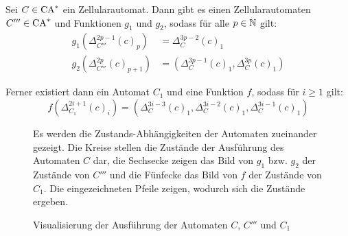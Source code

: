 \begin{satz}
    \label{CAgfSpeedup}
    Sei $C \in \textrm{CA}^*$ ein Zellularautomat.
    Dann gibt es einen Zellularautomaten $C''' \in \textrm{CA}^*$ und Funktionen $g_1$ und $g_2$, sodass für alle $p \in \mathbb{N}$ gilt:
    \begin{align*}
        g_1(\Delta_{C'''}^{2p-1}(c)_p) & = \Delta_C^{3p-2}(c)_1 \\
        g_2(\Delta_{C'''}^{2p}(c)_{p+1}) & = (\Delta_C^{3p-1}(c)_1, \Delta_C^{3p}(c)_1)
    \end{align*}
    
    Ferner existiert dann ein Automat $C_1$ und eine Funktion $f$, sodass für $i \geq 1$ gilt:
    \[
        f(\Delta_{C_1}^{2i+1}(c)_i) = (\Delta_C^{3i-3}(c)_1, \Delta_C^{3i-2}(c)_1, \Delta_C^{3i-1}(c)_1)
    \]
    
    \begin{figure}[H]
        \begin{center}
            
        \end{center}
        \caption{Visualisierung der Ausführung der Automaten $C$, $C'''$ und $C_1$}
        \label{fig:EchtzeitSpeedup}
        
        Es werden die Zustands-Abhängigkeiten der Automaten zueinander gezeigt.
        Die Kreise stellen die Zustände der Ausführung des Automaten $C$ dar, die Sechsecke zeigen das Bild von $g_1$ bzw. $g_2$
        der Zustände von $C'''$ und die Fünfecke das Bild von $f$ der Zustände von $C_1$. Die eingezeichneten Pfeile
        zeigen, wodurch sich die Zustände ergeben.
    \end{figure}
\end{satz}
